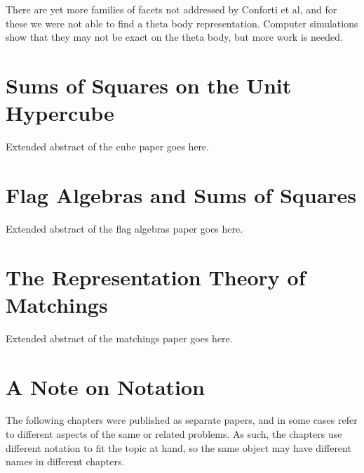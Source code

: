 There are yet more families of facets not addressed by Conforti 
et al, and for these we were not able to find a theta body representation. 
Computer simulations show that they may not be exact on the theta body, but
more work is needed.




\section{Sums of Squares on the Unit Hypercube}

Extended abstract of the cube paper goes here.

\section{Flag Algebras and Sums of Squares}

Extended abstract of the flag algebras paper goes here.

\section{The Representation Theory of Matchings}

Extended abstract of the matchings paper goes here.

\section{A Note on Notation}
The following chapters were published as separate papers, and in some cases
refer to different aspects of the same or related problems. As such, the 
chapters use different notation to fit the topic at hand, so the same object
may have different names in different chapters.
